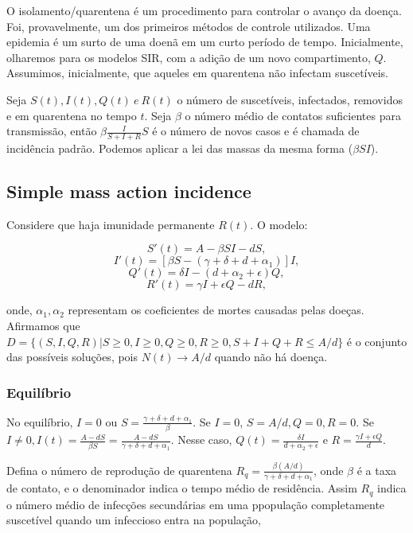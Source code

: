 O isolamento/quarentena é um procedimento para controlar o avanço da doença.
Foi, provavelmente, um dos primeiros métodos de controle utilizados. Uma
epidemia é um surto de uma doenã em um curto período de tempo. Inicialmente,
olharemos para os modelos SIR, com a adição de um novo compartimento, $Q$.
Assumimos, inicialmente, que aqueles em quarentena não infectam suscetíveis. 

Seja $S(t), I(t), Q(t) ~e~ R(t) $ o número de suscetíveis, infectados,
removidos e em quarentena no tempo $t$. Seja $\beta$ o número médio de
contatos suficientes para transmissão,  então $\beta\frac{I}{S + I + R}S$ é o
número de novos casos e é chamada de incidência padrão. Podemos aplicar a
lei das massas da mesma forma ($\beta SI$). 

\subsection{Simple mass action incidence}

Considere que haja imunidade permanente $R(t)$. O modelo: 

$$ S'(t) = A - \beta SI - dS,$$
$$ I'(t) = [\beta S - (\gamma + \delta + d + \alpha_1)]I,$$
$$ Q'(t) = \delta I - (d + \alpha_2 + \epsilon)Q,$$
$$ R'(t) = \gamma I + \epsilon Q - dR, $$

onde, $\alpha_1, \alpha_2$ representam os coeficientes de mortes causadas
pelas doeças. Afirmamos que $D = \{(S,I,Q,R) | S \geq 0, I \geq 0, Q \geq 0, R
\geq 0, S + I + Q + R \leq A/d\}$ é o conjunto das possíveis soluções, pois
$N(t) \to A/d$ quando não há doença. 

\subsubsection{Equilíbrio}

No equilíbrio, $I = 0$ ou $S = \frac{\gamma + \delta + d + \alpha_1}{\beta}$.
Se $I = 0$, $S = A/d, Q = 0, R = 0$. Se $I \neq 0, I(t) = \frac{A - dS}{\beta
S} = \frac{A - dS}{\gamma + \delta + d + \alpha_1}$. Nesse caso, $Q(t) =
\frac{\delta I}{d + \alpha_2 + \epsilon}$ e $R = \frac{\gamma I + \epsilon
Q}{d}$. 

Defina o número de reprodução de quarentena $R_q = \frac{\beta(A/d)}{\gamma +
\delta + d + \alpha_1}$, onde $\beta$ é a taxa de contato, e o denominador
indica o tempo médio de residência. Assim $R_q$ indica o número médio de
infecções secundárias em uma ppopulação completamente suscetível quando um
infeccioso entra na população,  